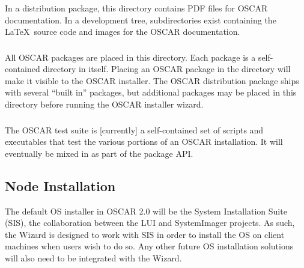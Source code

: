 
\subsubsection{}

In a distribution package, this directory contains PDF files for OSCAR
documentation.  In a development tree, subdirectories exist containing
the \LaTeX\ source code and images for the OSCAR documentation.


\subsubsection{}

All OSCAR packages are placed in this directory.  Each package is a
self-contained directory in itself.  Placing an OSCAR package
in the  directory will make it visible to the OSCAR
installer.  The OSCAR distribution package ships with several ``built
in'' packages, but additional packages may be placed in this directory
before running the OSCAR installer wizard.


\subsubsection{}

The OSCAR test suite is [currently] a self-contained set of scripts
and executables that test the various portions of an OSCAR
installation.  It will eventually be mixed in as part of the package
API.


\subsection{Node Installation}

The default OS installer in OSCAR 2.0 will be the System Installation
Suite (SIS), the collaboration between the LUI and SystemImager
projects. As such, the Wizard is designed to work with SIS in order to
install the OS on client machines when users wish to do so.  Any other
future OS installation solutions will also need to be integrated with
the Wizard.

